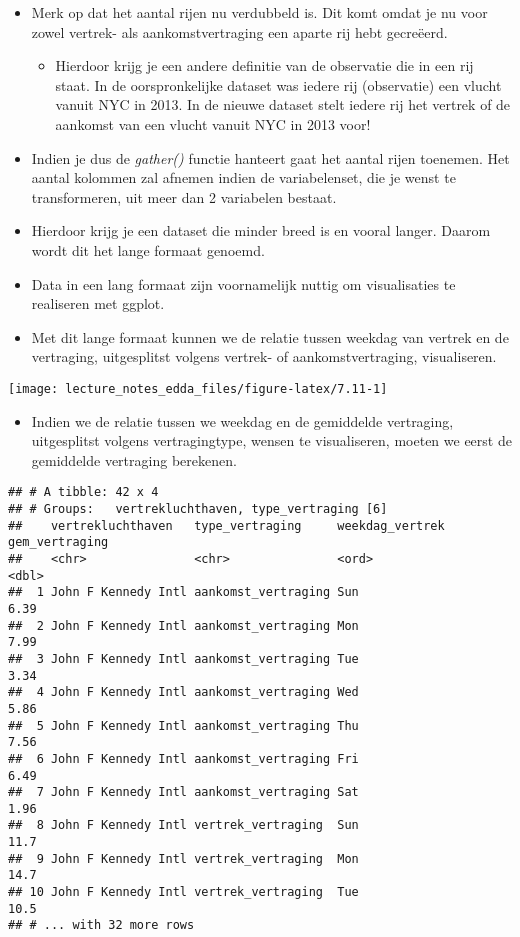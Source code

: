 \documentclass[]{memoir}
\providecommand{\tightlist}{%
  \setlength{\itemsep}{0pt}\setlength{\parskip}{0pt}}
\begin{document}
\begin{itemize}
\tightlist
\item
  Merk op dat het aantal rijen nu verdubbeld is. Dit komt omdat je nu voor zowel vertrek- als aankomstvertraging een aparte rij hebt gecreëerd.

  \begin{itemize}
  \tightlist
  \item
    Hierdoor krijg je een andere definitie van de observatie die in een rij staat. In de oorspronkelijke dataset was iedere rij (observatie) een vlucht vanuit NYC in 2013. In de nieuwe dataset stelt iedere rij het vertrek of de aankomst van een vlucht vanuit NYC in 2013 voor!
  \end{itemize}
\item
  Indien je dus de \emph{gather()} functie hanteert gaat het aantal rijen toenemen. Het aantal kolommen zal afnemen indien de variabelenset, die je wenst te transformeren, uit meer dan 2 variabelen bestaat.
\item
  Hierdoor krijg je een dataset die minder breed is en vooral langer. Daarom wordt dit het lange formaat genoemd.
\item
  Data in een lang formaat zijn voornamelijk nuttig om visualisaties te realiseren met ggplot.
\item
  Met dit lange formaat kunnen we de relatie tussen weekdag van vertrek en de vertraging, uitgesplitst volgens vertrek- of aankomstvertraging, visualiseren.
\end{itemize}

\texttt{[image: lecture\_notes\_edda\_files/figure-latex/7.11-1]}

\begin{itemize}
\tightlist
\item
  Indien we de relatie tussen we weekdag en de gemiddelde vertraging, uitgesplitst volgens vertragingtype, wensen te visualiseren, moeten we eerst de gemiddelde vertraging berekenen.
\end{itemize}

\begin{verbatim}
## # A tibble: 42 x 4
## # Groups:   vertrekluchthaven, type_vertraging [6]
##    vertrekluchthaven   type_vertraging     weekdag_vertrek gem_vertraging
##    <chr>               <chr>               <ord>                    <dbl>
##  1 John F Kennedy Intl aankomst_vertraging Sun                       6.39
##  2 John F Kennedy Intl aankomst_vertraging Mon                       7.99
##  3 John F Kennedy Intl aankomst_vertraging Tue                       3.34
##  4 John F Kennedy Intl aankomst_vertraging Wed                       5.86
##  5 John F Kennedy Intl aankomst_vertraging Thu                       7.56
##  6 John F Kennedy Intl aankomst_vertraging Fri                       6.49
##  7 John F Kennedy Intl aankomst_vertraging Sat                       1.96
##  8 John F Kennedy Intl vertrek_vertraging  Sun                      11.7 
##  9 John F Kennedy Intl vertrek_vertraging  Mon                      14.7 
## 10 John F Kennedy Intl vertrek_vertraging  Tue                      10.5 
## # ... with 32 more rows
\end{verbatim}
\end{document}
